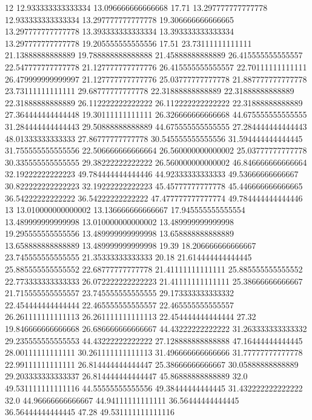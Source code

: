 12 12.933333333333334 13.096666666666668 17.71 13.297777777777778 12.933333333333334 13.297777777777778 19.306666666666665 13.297777777777778 13.393333333333334 13.393333333333334 13.297777777777778 19.205555555555556 17.51 23.73111111111111 21.13888888888889 19.788888888888888 21.45888888888889 26.415555555555557 22.547777777777778 21.127777777777776 26.415555555555557 22.70111111111111 26.479999999999997 21.127777777777776 25.03777777777778 21.887777777777778 23.73111111111111 29.68777777777778 22.31888888888889 22.31888888888889 22.31888888888889 26.112222222222222 26.112222222222222 22.31888888888889 27.364444444444448 19.30111111111111 26.326666666666668 44.675555555555555 31.284444444444443 29.50888888888889 44.675555555555555 27.284444444444443 48.01333333333333 27.86777777777778 30.545555555555556 31.594444444444445 31.755555555555556 22.506666666666664 26.560000000000002 25.03777777777778 30.335555555555555 29.38222222222222 26.560000000000002 46.846666666666664 32.19222222222223 49.784444444444446 44.92333333333333 49.53666666666667 30.822222222222223 32.19222222222223 45.45777777777778 45.446666666666665 36.54222222222222 36.54222222222222 47.477777777777774 49.784444444444446
13 13.010000000000002 13.136666666666667 17.945555555555554 13.489999999999998 13.010000000000002 13.489999999999998 19.295555555555556 13.489999999999998 13.658888888888889 13.658888888888889 13.489999999999998 19.39 18.206666666666667 23.745555555555555 21.35333333333333 20.18 21.614444444444445 25.885555555555552 22.68777777777778 21.41111111111111 25.885555555555552 22.773333333333333 26.072222222222223 21.41111111111111 25.38666666666667 21.715555555555557 23.745555555555555 29.173333333333332 22.454444444444444 22.465555555555557 22.465555555555557 26.261111111111113 26.261111111111113 22.454444444444444 27.32 19.846666666666668 26.686666666666667 44.43222222222222 31.263333333333332 29.235555555555553 44.43222222222222 27.128888888888888 47.16444444444445 28.00111111111111 30.261111111111113 31.496666666666666 31.77777777777778 22.99111111111111 26.814444444444447 25.38666666666667 30.05888888888889 29.203333333333337 26.814444444444447 45.86888888888889 32.0 49.531111111111116 44.55555555555556 49.38444444444445 31.432222222222222 32.0 44.96666666666667 44.94111111111111 36.56444444444445 36.56444444444445 47.28 49.531111111111116
